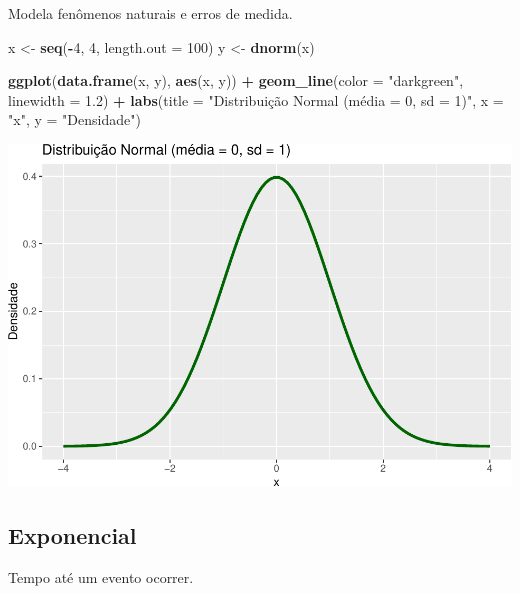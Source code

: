 \documentclass[
]{book}
\newenvironment{Shaded}{\begin{snugshade}}{\end{snugshade}}
\newcommand{\AttributeTok}[1]{\textcolor[rgb]{0.13,0.29,0.53}{#1}}
\newcommand{\DecValTok}[1]{\textcolor[rgb]{0.00,0.00,0.81}{#1}}
\newcommand{\FloatTok}[1]{\textcolor[rgb]{0.00,0.00,0.81}{#1}}
\newcommand{\FunctionTok}[1]{\textcolor[rgb]{0.13,0.29,0.53}{\textbf{#1}}}
\newcommand{\NormalTok}[1]{#1}
\newcommand{\OtherTok}[1]{\textcolor[rgb]{0.56,0.35,0.01}{#1}}
\newcommand{\SpecialCharTok}[1]{\textcolor[rgb]{0.81,0.36,0.00}{\textbf{#1}}}
\newcommand{\StringTok}[1]{\textcolor[rgb]{0.31,0.60,0.02}{#1}}
\begin{document}
Modela fenômenos naturais e erros de medida.

\begin{Shaded}
\begin{Highlighting}[]
\NormalTok{x }\OtherTok{\textless{}{-}} \FunctionTok{seq}\NormalTok{(}\SpecialCharTok{{-}}\DecValTok{4}\NormalTok{, }\DecValTok{4}\NormalTok{, }\AttributeTok{length.out =} \DecValTok{100}\NormalTok{)}
\NormalTok{y }\OtherTok{\textless{}{-}} \FunctionTok{dnorm}\NormalTok{(x)}

\FunctionTok{ggplot}\NormalTok{(}\FunctionTok{data.frame}\NormalTok{(x, y), }\FunctionTok{aes}\NormalTok{(x, y)) }\SpecialCharTok{+}
  \FunctionTok{geom\_line}\NormalTok{(}\AttributeTok{color =} \StringTok{"darkgreen"}\NormalTok{, }\AttributeTok{linewidth =} \FloatTok{1.2}\NormalTok{) }\SpecialCharTok{+}
  \FunctionTok{labs}\NormalTok{(}\AttributeTok{title =} \StringTok{"Distribuição Normal (média = 0, sd = 1)"}\NormalTok{, }\AttributeTok{x =} \StringTok{"x"}\NormalTok{, }\AttributeTok{y =} \StringTok{"Densidade"}\NormalTok{)}
\end{Highlighting}
\end{Shaded}

\includegraphics{LivroEstatisticaR_files/figure-latex/normal_plot_Dist-1.pdf}

\subsection{Exponencial}\label{exponencial}

Tempo até um evento ocorrer.
\end{document}
